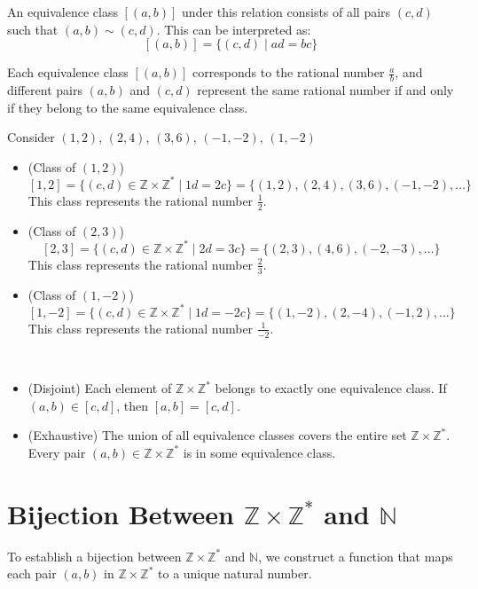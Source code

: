 An equivalence class \([(a, b)]\) under this relation consists of all pairs \((c, d)\) such that \((a, b) \sim (c, d)\). This can be interpreted as:
\[
[(a, b)] = \{ (c, d) \mid ad = bc \}
\]

Each equivalence class \([(a, b)]\) corresponds to the rational number \(\frac{a}{b}\), and different pairs \((a, b)\) and \((c, d)\) represent the same rational number if and only if they belong to the same equivalence class.

\begin{example}
Consider \((1, 2)\), \((2, 4)\), \((3, 6)\), \((-1, -2)\), \((1, -2)\)
\begin{itemize}
	\item (Class of $(1,2)$)
\[
[1, 2] = \{ (c, d) \in \mathbb{Z} \times \mathbb{Z}^* \mid 1d = 2c \} = \{ (1, 2), (2, 4), (3, 6), (-1, -2), \ldots \}
\]
This class represents the rational number \(\frac{1}{2}\).
\item (Class of $(2,3)$)
\[
[2, 3] = \{ (c, d) \in \mathbb{Z} \times \mathbb{Z}^* \mid 2d = 3c \} = \{ (2, 3), (4, 6), (-2, -3), \ldots \}
\]
This class represents the rational number \(\frac{2}{3}\).
\item (Class of $(1,-2)$)
\[
[1, -2] = \{ (c, d) \in \mathbb{Z} \times \mathbb{Z}^* \mid 1d = -2c \} = \{ (1, -2), (2, -4), (-1, 2), \ldots \}
\]
This class represents the rational number \(\frac{1}{-2}\).
\end{itemize}
\end{example}

\begin{remark}
\ \begin{itemize}
	\item (Disjoint) Each element of \(\mathbb{Z} \times \mathbb{Z}^*\) belongs to exactly one equivalence class. If \((a, b) \in [c, d]\), then \([a, b] = [c, d]\).
	\item (Exhaustive) The union of all equivalence classes covers the entire set \(\mathbb{Z} \times \mathbb{Z}^*\). Every pair \((a, b) \in \mathbb{Z} \times \mathbb{Z}^*\) is in some equivalence class.
\end{itemize}
\end{remark}

\section*{Bijection Between \(\mathbb{Z} \times \mathbb{Z}^*\) and \(\mathbb{N}\)}

To establish a bijection between \(\mathbb{Z} \times \mathbb{Z}^*\) and \(\mathbb{N}\), we construct a function that maps each pair \((a, b)\) in \(\mathbb{Z} \times \mathbb{Z}^*\) to a unique natural number.

